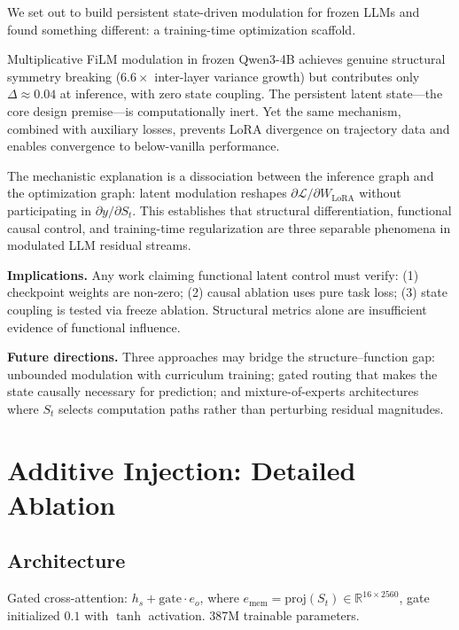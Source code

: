 \documentclass[11pt,a4paper]{article}
\newcommand{\R}{\mathbb{R}}
\newcommand{\St}{S_t}
\begin{document}
We set out to build persistent state-driven modulation for frozen LLMs and found
something different: a training-time optimization scaffold.

Multiplicative FiLM modulation in frozen Qwen3-4B achieves genuine structural
symmetry breaking ($6.6\times$ inter-layer variance growth) but contributes only
$\Delta \approx 0.04$ at inference, with zero state coupling. The persistent latent
state---the core design premise---is computationally inert. Yet the same mechanism,
combined with auxiliary losses, prevents LoRA divergence on trajectory data and
enables convergence to below-vanilla performance.

The mechanistic explanation is a dissociation between the inference graph and the
optimization graph: latent modulation reshapes $\partial \mathcal{L} / \partial
W_{\mathrm{LoRA}}$ without participating in $\partial y / \partial S_t$. This
establishes that structural differentiation, functional causal control, and
training-time regularization are three separable phenomena in modulated LLM
residual streams.

\textbf{Implications.} Any work claiming functional latent control must verify:
(1) checkpoint weights are non-zero; (2) causal ablation uses pure task loss;
(3) state coupling is tested via freeze ablation. Structural metrics alone are
insufficient evidence of functional influence.

\textbf{Future directions.} Three approaches may bridge the structure--function gap:
unbounded modulation with curriculum training; gated routing that makes the state
causally necessary for prediction; and mixture-of-experts architectures where
$\St$ selects computation paths rather than perturbing residual magnitudes.

\appendix

\section{Additive Injection: Detailed Ablation}
\label{app:additive}

\subsection*{Architecture}

Gated cross-attention: $h_s + \mathrm{gate} \cdot e_o$, where
$e_{\mathrm{mem}} = \mathrm{proj}(\St) \in \R^{16 \times 2560}$,
gate initialized $0.1$ with $\tanh$ activation. 387M trainable parameters.
\end{document}
